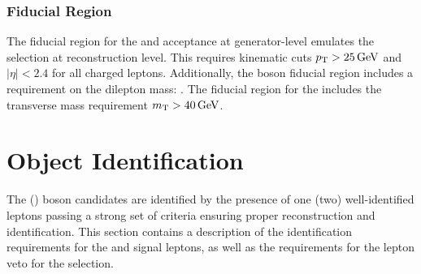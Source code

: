 \subsubsection{Fiducial Region}
The fiducial region for the \Wpm and \Z acceptance at generator-level emulates the selection at reconstruction level. This requires kinematic cuts $p_{\mathrm{T}} > 25 \,\text{Ge\hspace{-.08em}V}$ and $|\eta| < 2.4$ for all charged leptons. Additionally, the \Z boson fiducial region includes a requirement on the dilepton mass: \masswindow. The fiducial region for the \Wpm includes the transverse mass requirement $m_{\mathrm{T}}>40\,\text{Ge\hspace{-.08em}V}$.


\section{Object Identification}\label{ch:IdIso}
The \Wpm (\Z) boson candidates are identified by the presence of one (two) well-identified leptons passing a strong set of criteria ensuring proper reconstruction and identification. This section contains a description of the identification requirements for the \wlnu and \zll signal leptons, as well as the requirements for the lepton veto for the \Wpm selection.

